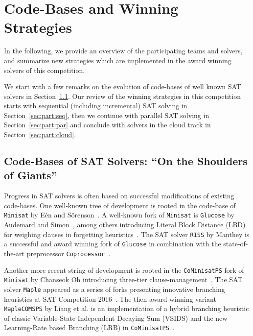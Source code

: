 \documentclass{elsarticle}
\newcommand{\solver}[1]{\texttt{#1}}
\begin{document}
\section{Code-Bases and Winning Strategies}
\label{sec:analysis}

In the following, we provide an overview of the participating teams and solvers, 
and summarize new strategies which are implemented in the award winning solvers of this competition. 

We start with a few remarks on the evolution of code-bases of well known SAT solvers in Section~\ref{sec:codebases}. 
Our review of the winning strategies in this competition starts with sequential (including incremental) SAT solving in Section~\ref{sec:part:seq}, then we continue with parallel SAT solving in Section~\ref{sec:part:par} and conclude with solvers in the cloud track in Section~\ref{sec:part:cloud}. 


\subsection{Code-Bases of SAT Solvers: ``On the Shoulders of Giants''}
\label{sec:codebases}

Progress in SAT solvers is often based on successful modifications of existing code-bases. 
One well-known tree of development is rooted in the code-base of \solver{Minisat} by Eén and Sörenson~\cite{Niklas:2003:Minisat}. 
A well-known fork of \solver{Minisat} is \solver{Glucose} by Audemard and Simon~\cite{Audemard:2018:Glucose}, among others introducing Literal Block Distance (LBD) for weighing clauses in forgetting heuristics~\cite{Audemard:2009:Glucose}. 
The SAT solver \solver{RISS} by Manthey is a successful and award winning fork of \solver{Glucose} in combination with the state-of-the-art preprocessor \solver{Coprocessor}~\cite{Manthey:2012:Coprocessor2}. 

Another more recent string of development is rooted in the \solver{CoMinisatPS} fork of \solver{Minisat} by Chanseok Oh introducing three-tier clause-management~\cite{Oh:2015:satunsat}. 
The SAT solver \solver{Maple} appeared as a series of forks presenting innovative branching heuristics at SAT Competition 2016~\cite{Liang:2016:LRB}. 
The then award winning variant \solver{MapleCOMSPS} by Liang et al. is an implementation of a hybrid branching heuristic of classic Variable-State Independent Decaying Sum (VSIDS) and the new Learning-Rate based Branching (LRB) in \solver{CoMinisatPS}~\cite{Liang:2016:MapleCOMSPS}. 
\end{document}
